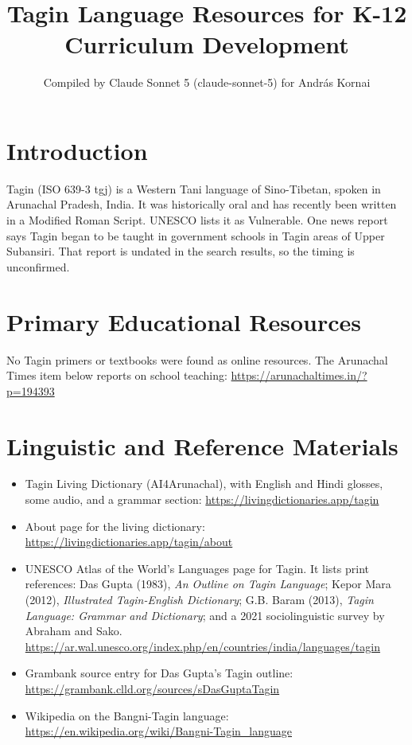 \documentclass[12pt]{article}
\title{Tagin Language Resources for K-12 Curriculum Development}
\author{Compiled by Claude Sonnet 5 (claude-sonnet-5) for Andr\'as Kornai}
\date{}
\begin{document}
\maketitle

\section{Introduction}
Tagin (ISO 639-3 tgj) is a Western Tani language of Sino-Tibetan, spoken in Arunachal Pradesh, India. It was historically oral and has recently been written in a Modified Roman Script. UNESCO lists it as Vulnerable. One news report says Tagin began to be taught in government schools in Tagin areas of Upper Subansiri. That report is undated in the search results, so the timing is unconfirmed.

\section{Primary Educational Resources}
No Tagin primers or textbooks were found as online resources. The Arunachal Times item below reports on school teaching: \url{https://arunachaltimes.in/?p=194393}

\section{Linguistic and Reference Materials}
\begin{itemize}
\item Tagin Living Dictionary (AI4Arunachal), with English and Hindi glosses, some audio, and a grammar section: \url{https://livingdictionaries.app/tagin}
\item About page for the living dictionary: \url{https://livingdictionaries.app/tagin/about}
\item UNESCO Atlas of the World's Languages page for Tagin. It lists print references: Das Gupta (1983), \emph{An Outline on Tagin Language}; Kepor Mara (2012), \emph{Illustrated Tagin-English Dictionary}; G.B. Baram (2013), \emph{Tagin Language: Grammar and Dictionary}; and a 2021 sociolinguistic survey by Abraham and Sako. \url{https://ar.wal.unesco.org/index.php/en/countries/india/languages/tagin}
\item Grambank source entry for Das Gupta's Tagin outline: \url{https://grambank.clld.org/sources/sDasGuptaTagin}
\item Wikipedia on the Bangni-Tagin language: \url{https://en.wikipedia.org/wiki/Bangni-Tagin_language}
\end{itemize}
\end{document}
